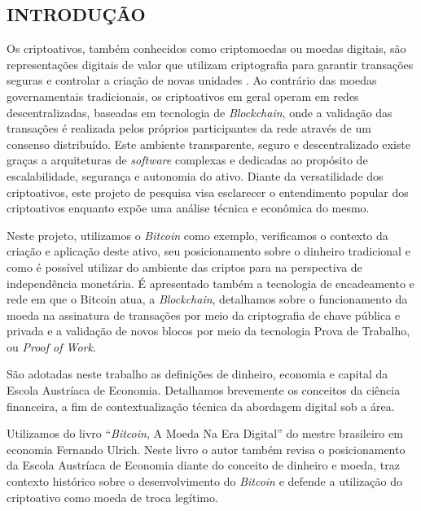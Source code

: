 \documentclass[article,12pt,oneside,a4paper,english,brazil]{unifil}
\begin{document}
\textual
\fontsize{12}{7}\selectfont
\begin{Spacing}{1.5}

% 

\section*{INTRODUÇÃO}

Os criptoativos, também conhecidos como criptomoedas ou moedas digitais, são representações digitais de valor que utilizam criptografia para garantir transações seguras e controlar a criação de novas unidades \cite{Yetmar2023}. Ao contrário das moedas governamentais tradicionais, os criptoativos em geral operam em redes descentralizadas, baseadas em tecnologia de \textit{Blockchain}, onde a validação das transações é realizada pelos próprios participantes da rede através de um consenso distribuído. Este ambiente transparente, seguro e descentralizado existe graças a arquiteturas de \textit{software} complexas e dedicadas ao propósito de escalabilidade, segurança e autonomia do ativo. Diante da versatilidade dos criptoativos, este projeto de pesquisa visa esclarecer o entendimento popular dos criptoativos enquanto expõe uma análise técnica e econômica do mesmo.

Neste projeto, utilizamos o \textit{Bitcoin} como exemplo, verificamos o contexto da criação e aplicação deste ativo, seu posicionamento sobre o dinheiro tradicional e como é possível utilizar do ambiente das criptos para na perspectiva de independência monetária. É apresentado também a tecnologia de encadeamento e rede em que o Bitcoin atua, a \textit{Blockchain}, detalhamos sobre o funcionamento da moeda na assinatura de transações por meio da criptografia de chave pública e privada e a validação de novos blocos por meio da tecnologia Prova de Trabalho, ou \textit{Proof of Work}.

São adotadas neste trabalho as definições de dinheiro, economia e capital da Escola Austríaca de Economia. Detalhamos brevemente os conceitos da ciência financeira, a fim de contextualização técnica da abordagem digital sob a área.

Utilizamos do livro ``\textit{Bitcoin}, A Moeda Na Era Digital'' do mestre brasileiro em economia Fernando Ulrich. Neste livro o autor também revisa o posicionamento da Escola Austríaca de Economia diante do conceito de dinheiro e moeda, traz contexto histórico sobre o desenvolvimento do \textit{Bitcoin} e defende a utilização do criptoativo como moeda de troca legítimo.



\end{Spacing}
\end{document}
